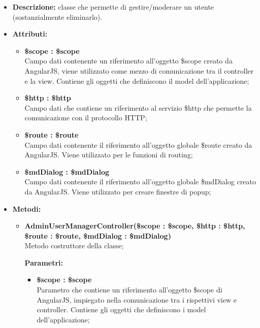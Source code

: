 \begin{itemize}
	\item \textbf{Descrizione:} classe che permette di gestire/moderare un utente (sostanzialmente eliminarlo).
	\item \textbf{Attributi:}
	\begin{itemize}
		
		\item \textbf{\$scope : \$scope}\\
		Campo dati contenente un riferimento all'oggetto \$scope creato da AngularJS, viene utilizzato come mezzo di comunicazione tra il controller e la view. Contiene gli oggetti che definiscono il model dell'applicazione;
		
		\item \textbf{\$http : \$http }\\
		Campo dati che contiene un riferimento al servizio \$http che permette la comunicazione con il protocollo HTTP;
		
		\item \textbf{\$route : \$route }\\
		Campo dati contenente il riferimento all'oggetto globale \$route creato da AngularJS. Viene utilizzato per le funzioni di routing;
		
		\item \textbf{\$mdDialog : \$mdDialog }\\
		Campo dati contenente il riferimento all'oggetto globale \$mdDialog creato da AngularJS. Viene utilizzato per creare finestre di popup;
		
		
	\end{itemize}
	\item \textbf{Metodi:}
	\begin{itemize}
		
		\item \textbf{AdminUserManagerController(\$scope : \$scope, \$http : \$http, \$route : \$route, \$mdDialog : \$mdDialog)}\\
		Metodo costruttore della classe;
		\begin{description}
			\item[\textbf{Parametri:}]
		\end{description}
		\begin{itemize}
			\item \textbf{\$scope : \$scope}\\
			Parametro che contiene un riferimento all'oggetto \$scope di AngularJS, impiegato nella comunicazione tra i rispettivi view e controller. Contiene gli oggetti che definiscono i model dell'applicazione;
			

\end{itemize}
\end{itemize}
\end{itemize}
